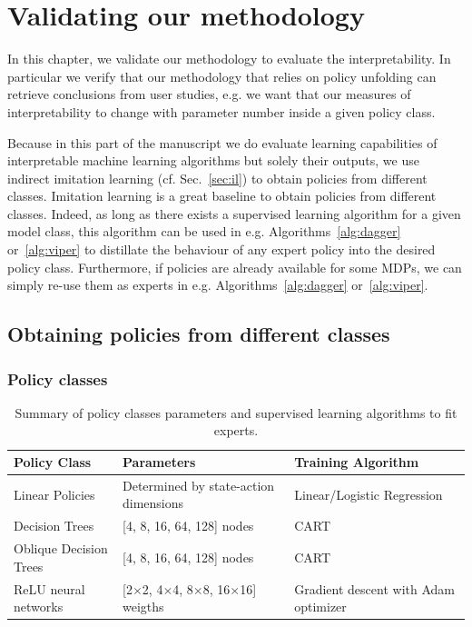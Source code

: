 \chapter{Validating our methodology}\label{sec:exps1}

In this chapter, we validate our methodology to evaluate the interpretability.
In particular we verify that our methodology that relies on policy unfolding can retrieve conclusions from user studies, e.g. we want that our measures of interpretability to change with parameter number inside a given policy class.

Because in this part of the manuscript we do evaluate learning capabilities of interpretable machine learning algorithms but solely their outputs, we use indirect imitation learning (cf. Sec.~\ref{sec:il}) to obtain policies from different classes.
Imitation learning is a great baseline to obtain policies from different classes.
Indeed, as long as there exists a supervised learning algorithm for a given model class, this algorithm can be used in e.g. Algorithms~\ref{alg:dagger} or~\ref{alg:viper} to distillate the behaviour of any expert policy into the desired policy class. 
Furthermore, if policies are already available for some MDPs, we can simply re-use them as experts in e.g. Algorithms~\ref{alg:dagger} or~\ref{alg:viper}.

\section{Obtaining policies from different classes}

\subsection{Policy classes}
\begin{table}[ht]
\centering
\small
\begin{tabular}{lll}
\hline
\textbf{Policy Class} & \textbf{Parameters} & \textbf{Training Algorithm} \\
\hline
Linear Policies & Determined by state-action dimensions & Linear/Logistic Regression \\
Decision Trees & [4, 8, 16, 64, 128] nodes & CART \\
Oblique Decision Trees & [4, 8, 16, 64, 128] nodes & CART \\
ReLU neural networks & [2$\times$2, 4$\times$4, 8$\times$8, 16$\times$16] weigths & Gradient descent with Adam optimizer \\
\hline
\end{tabular}
\caption{Summary of policy classes parameters and supervised learning algorithms to fit experts.}
\label{tab:policy-classes}
\end{table}

